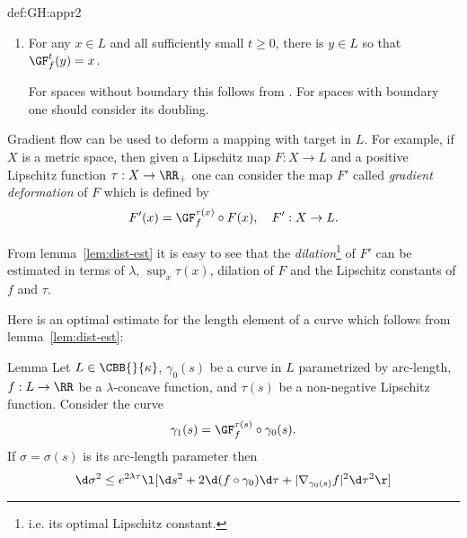 {\begin{subthm}{def:GH:appr2}
\begin{enumerate}
If $L_n\in\CBB{n}{\kappa}$ and  $L_n\GHto L$, $f_n:L_n\to\RR$ is a sequence of
$\lambda$-concave functions which converges to $f:L\to \RR$ then
$\GF_{f_n}^t:L_n\to L_n$ converges pointwise to $\GF_f^t:L\to L$.

This follows  from lemma~\ref{lem:stable-grad-curves}.

\item\label{grad-onto} For any $x\in L$ and all sufficiently small $t\ge0$, there is $y\in L$ so that 
$\GF_f^t(y)=x$.

For spaces without boundary this follows from 
\cite[lemma 1]{grove-petersen:rad-sphere}.
For spaces with boundary one should consider its doubling.
\end{enumerate}

Gradient flow can be used to deform a mapping with target in $L$. 
For example, if $X$ is a metric space, then given a Lipschitz map $F:X\to L$ and
a positive Lipschitz function $\tau:X\to \RR_+$ one can consider the map $F'$ called
\emph{gradient deformation} of $F$ which is defined by
$$F'(x)=\GF_f^{\tau(x)}\circ F(x),\ \ \ F':X\to L.$$

From lemma~\ref{lem:dist-est} it is easy to see that the \emph{dilation}\footnote{i.e. its optimal Lipschitz constant.}
of $F'$
can be estimated in terms of $\lambda$, $\sup_x\tau(x)$, dilation of $F$ and the
Lipschitz constants of $f$ and $\tau$.

Here is an optimal estimate for the length element of a curve which follows from
lemma~\ref{lem:dist-est}:

\begin{thm}{Lemma} \label{lem:grad-variation} Let $L\in\CBB{}{\kappa}$, $\gamma_0(s)$ be a curve in $L$ parametrized by arc-length, $f:L\to\RR$ be
a $\lambda$-concave function, and $\tau(s)$ be a non-negative Lipschitz
function. 
Consider the curve 
$$\gamma_1(s)=\GF^{\tau(s)}_f \circ\gamma_0(s).$$ 
If $\sigma=\sigma(s)$ is its
arc-length parameter then
$$\d\sigma^2\le e^{2\lambda\tau}\l[\d
s^2+2\d(f\circ\gamma_0)\d\tau+|\nabla_{\gamma_0(s)}f|^2\d\tau^2\r]$$
\end{thm}
























\end{subthm}}
